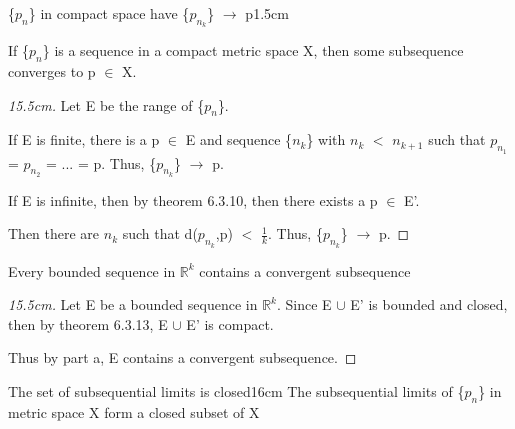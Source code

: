     \begin{ltheorem}{\{$p_n$\} in compact space have
    \{$p_{n_k}$\} $\rightarrow$ p}{1.5cm}
        \item If \{$p_n$\} is a sequence in a compact metric space X,
            then some subsequence converges to p $\in$ X.

            \begin{proof}[15.5cm]
                Let E be the range of \{$p_n$\}.

                If E is finite, there is a p $\in$ E and sequence
                \{$n_k$\} with $n_k$ $<$ $n_{k+1}$ such that
                $p_{n_1}$ = $p_{n_2}$ = ... = p.
                Thus, \{$p_{n_k}$\} $\rightarrow$ p.

                If E is infinite, then by {\color{red} theorem 6.3.10},
                then there exists a p $\in$ E'.

                Then there are $n_k$ such that d($p_{n_k}$,p) $<$ $\frac{1}{k}$.
                Thus, \{$p_{n_k}$\} $\rightarrow$ p.                
            \end{proof}

        \item Every bounded sequence in $\mathbb{R}^k$ contains
            a convergent subsequence

            \begin{proof}[15.5cm]
                Let E be a bounded sequence in $\mathbb{R}^k$.
                Since E $\cup$ E' is bounded and closed, then by
                {\color{red} theorem 6.3.13}, E $\cup$ E' is compact.
                
                Thus by part a, E contains a convergent subsequence.
            \end{proof}
    \end{ltheorem}

    \vspace{0.5cm}



    \begin{wtheorem}{The set of subsequential limits is closed}{16cm}
        The subsequential limits of \{$p_n$\} in metric space X form
        a closed subset of X
    \end{wtheorem}
    
